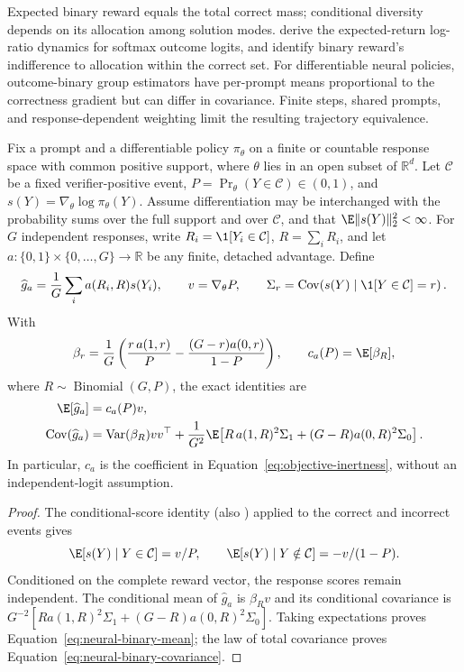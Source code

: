 Expected binary reward equals the total correct mass; conditional diversity
depends on its allocation among solution modes.
\citet[Theorem~3.1, v1]{sinha2026expected} derive the expected-return
log-ratio dynamics for softmax outcome logits, and
\citet[Section~4.1, v1]{lochab2026ucpo} identify binary reward's
indifference to allocation within the correct set. For differentiable neural
policies, outcome-binary group estimators have per-prompt means proportional
to the correctness gradient but can differ in covariance. Finite steps,
shared prompts, and response-dependent weighting limit the resulting
trajectory equivalence.

\begin{theorem}
\enforcehalffinalproseline
\label{thm:neural-binary-moments}
Fix a prompt and a differentiable policy $\pi_\theta$ on a finite or countable
response space with common positive support, where $\theta$ lies in an open
subset of $\mathbb R^d$. Let $\mathcal C$ be a fixed verifier-positive event,
$P=\Pr_\theta(Y\in\mathcal C)\in(0,1)$, and
$s(Y)=\nabla_\theta\log\pi_\theta(Y)$. Assume differentiation may be
interchanged with the probability sums over the full support and over
$\mathcal C$, and that $\E\|s(Y)\|_2^2<\infty$. For $G$ independent
responses, write $R_i=\1[Y_i\in\mathcal C]$, $R=\sum_iR_i$, and let
$a:\{0,1\}\times\{0,\ldots,G\}\to\mathbb R$ be any finite, detached
advantage. Define
\[
 \widehat g_a=\frac1G\sum_i a(R_i,R)s(Y_i),\qquad
 v=\nabla_\theta P,\qquad
 \Sigma_r=\operatorname{Cov}\!\left(s(Y)\mid\1[Y\in\mathcal C]=r\right).
\]
With
\[
 \beta_r=\frac1G\left(\frac{r\,a(1,r)}P
          -\frac{(G-r)a(0,r)}{1-P}\right),
 \qquad c_a(P)=\E[\beta_R],
\]
where $R\sim\operatorname{Binomial}(G,P)$, the exact identities are
\begin{align}
 \E[\widehat g_a]&=c_a(P)v,
 \label{eq:neural-binary-mean}\\
 \operatorname{Cov}(\widehat g_a)
 &=\operatorname{Var}(\beta_R)vv^\top
   +\frac1{G^2}\E\!\left[
       R\,a(1,R)^2\Sigma_1+(G-R)a(0,R)^2\Sigma_0\right].
 \label{eq:neural-binary-covariance}
\end{align}
In particular, $c_a$ is the coefficient in
Equation~\eqref{eq:objective-inertness}, without an independent-logit
assumption.
\end{theorem}

\begin{proof}
\enforcehalffinalproseline
The conditional-score identity
\citep[Theorem~1]{tajwar2026maxrl} (also
\citealp[Lemma~B.1]{avspo2026}) applied to the correct and incorrect events gives
\[
 \E[s(Y)\mid Y\in\mathcal C]=v/P,
 \qquad
 \E[s(Y)\mid Y\notin\mathcal C]=-v/(1-P).
\]
Conditioned on the complete reward vector, the response scores remain
independent. The conditional mean of $\widehat g_a$ is $\beta_Rv$ and
its conditional covariance is
$G^{-2}[R a(1,R)^2\Sigma_1+(G-R)a(0,R)^2\Sigma_0]$.
Taking expectations proves Equation~\eqref{eq:neural-binary-mean}; the law
of total covariance proves Equation~\eqref{eq:neural-binary-covariance}.
\end{proof}

